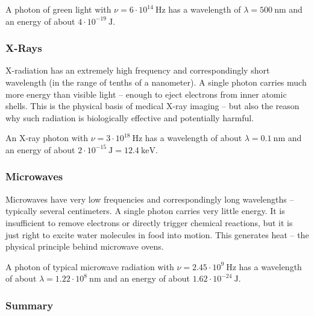 \begin{tcolorbox}[physikbox, title=Green Light]
	\label{box:grünesLicht}
	A photon of green light with \( \nu = 6 \cdot 10^{14}~\mathrm{Hz} \) has a wavelength of \( \lambda = 500~\mathrm{nm} \) and an energy of about \( 4 \cdot 10^{-19}~\mathrm{J} \).
\end{tcolorbox}

\subsubsection*{X-Rays}
X-radiation has an extremely high frequency and correspondingly short wavelength (in the range of tenths of a nanometer). A single photon carries much more energy than visible light – enough to eject electrons from inner atomic shells. This is the physical basis of medical X-ray imaging – but also the reason why such radiation is biologically effective and potentially harmful.
\vspace{1em}
\begin{tcolorbox}[physikbox, title=X-Rays]
	\label{box:röntgenstrahlen}
	An X-ray photon with \( \nu = 3 \cdot 10^{18}~\mathrm{Hz} \) has a wavelength of about \( \lambda = 0.1~\mathrm{nm} \) and an energy of about \( 2 \cdot 10^{-15}~\mathrm{J} = 12.4~\mathrm{keV} \).
\end{tcolorbox}

\subsubsection*{Microwaves}
Microwaves have very low frequencies and correspondingly long wavelengths – typically several centimeters. A single photon carries very little energy. It is insufficient to remove electrons or directly trigger chemical reactions, but it is just right to excite water molecules in food into motion. This generates heat – the physical principle behind microwave ovens.
\vspace{1em}
\begin{tcolorbox}[physikbox, title=Microwaves]
	\label{box:Mikrowellenstrahlung}
	A photon of typical microwave radiation with \( \nu = 2.45 \cdot 10^9~\mathrm{Hz} \) has a wavelength of about \( \lambda = 1.22\cdot 10^8~\mathrm{nm} \)
	and an energy of about \( 1.62 \cdot 10^{-24}~\mathrm{J} \).
\end{tcolorbox}
\newpage
\noindent
\subsubsection{Summary}


